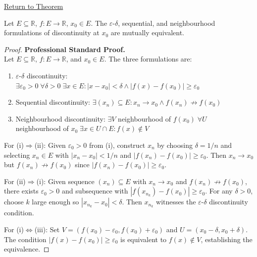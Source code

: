 \newpage
{}
\label{prf:equivalent-discontinuity-at-a-point}

\begin{remark*}[Return]
\hyperref[lem:equivalent-discontinuity-at-a-point]{Return to Theorem}
\end{remark*}

\begin{theorem*}
Let $E \subseteq \mathbb{R}$, $f : E \to \mathbb{R}$, $x_0 \in E$. The $\varepsilon$-$\delta$, sequential, and neighbourhood formulations of discontinuity at $x_0$ are mutually equivalent.
\end{theorem*}

\begin{proof}
\textbf{Professional Standard Proof.}~\\
Let $E \subseteq \mathbb{R}$, $f : E \to \mathbb{R}$, and $x_0 \in E$. The three formulations are:
\begin{enumerate}[label=\textup{(\roman*)}]
\item $\varepsilon$-$\delta$ discontinuity: $\exists \varepsilon_0>0\;\forall \delta>0\;\exists x\in E: |x-x_0|<\delta \wedge |f(x)-f(x_0)|\ge \varepsilon_0$
\item Sequential discontinuity: $\exists (x_n) \subseteq E: x_n\to x_0 \wedge f(x_n)\not\to f(x_0)$
\item Neighbourhood discontinuity: $\exists V$ neighbourhood of $f(x_0)\;\forall U$ neighbourhood of $x_0\;\exists x\in U\cap E: f(x)\notin V$
\end{enumerate}

For (i)$\Rightarrow$(ii): Given $\varepsilon_0>0$ from (i), construct $x_n$ by choosing $\delta=1/n$ and selecting $x_n \in E$ with $|x_n-x_0|<1/n$ and $|f(x_n)-f(x_0)|\ge \varepsilon_0$. Then $x_n\to x_0$ but $f(x_n)\not\to f(x_0)$ since $|f(x_n)-f(x_0)|\ge \varepsilon_0$.

For (ii)$\Rightarrow$(i): Given sequence $(x_n) \subseteq E$ with $x_n\to x_0$ and $f(x_n)\not\to f(x_0)$, there exists $\varepsilon_0>0$ and subsequence with $|f(x_{n_k})-f(x_0)|\ge \varepsilon_0$. For any $\delta>0$, choose $k$ large enough so $|x_{n_k}-x_0|<\delta$. Then $x_{n_k}$ witnesses the $\varepsilon$-$\delta$ discontinuity condition.

For (i)$\Leftrightarrow$(iii): Set $V=(f(x_0)-\varepsilon_0, f(x_0)+\varepsilon_0)$ and $U=(x_0-\delta, x_0+\delta)$. The condition $|f(x)-f(x_0)|\ge \varepsilon_0$ is equivalent to $f(x)\notin V$, establishing the equivalence.
\end{proof}

